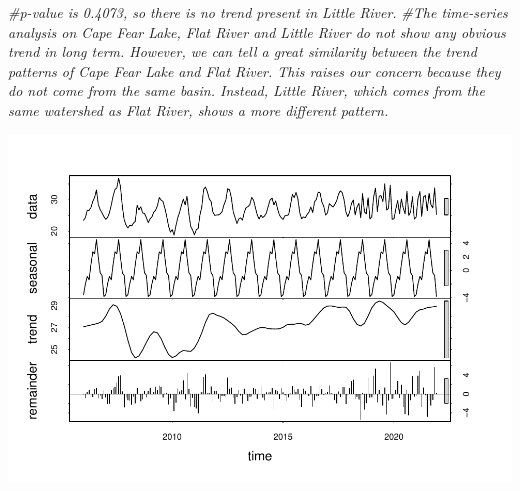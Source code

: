 \documentclass[
  12pt,
]{article}
\newenvironment{Shaded}{\begin{snugshade}}{\end{snugshade}}
\newcommand{\AttributeTok}[1]{\textcolor[rgb]{0.77,0.63,0.00}{#1}}
\newcommand{\CommentTok}[1]{\textcolor[rgb]{0.56,0.35,0.01}{\textit{#1}}}
\newcommand{\DecValTok}[1]{\textcolor[rgb]{0.00,0.00,0.81}{#1}}
\newcommand{\FunctionTok}[1]{\textcolor[rgb]{0.00,0.00,0.00}{#1}}
\newcommand{\NormalTok}[1]{#1}
\newcommand{\OtherTok}[1]{\textcolor[rgb]{0.56,0.35,0.01}{#1}}
\newcommand{\SpecialCharTok}[1]{\textcolor[rgb]{0.00,0.00,0.00}{#1}}
\newcommand{\StringTok}[1]{\textcolor[rgb]{0.31,0.60,0.02}{#1}}
\begin{document}
\begin{Shaded}
\begin{Highlighting}[]
\CommentTok{\#p{-}value is 0.4073, so there is no trend present in Little River.}
\CommentTok{\#The time{-}series analysis on Cape Fear Lake, Flat River and Little River do not show any obvious trend in long term. However, we can tell a great similarity between the trend patterns of Cape Fear Lake and Flat River. This raises our concern because they do not come from the same basin. Instead, Little River, which comes from the same watershed as Flat River, shows a more different pattern.}
\end{Highlighting}
\end{Shaded}

\begin{Shaded}
\end{Shaded}

\includegraphics{Project_files/figure-latex/time-series analysis on withdrawals-1.pdf}
\end{document}
